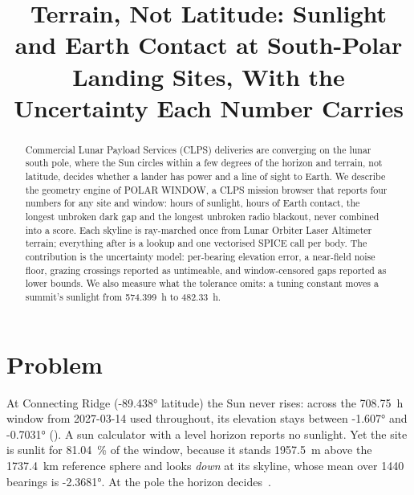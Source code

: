 \documentclass[conference]{IEEEtran}
\begin{document}
\title{Terrain, Not Latitude: Sunlight and Earth Contact at South-Polar Landing
Sites, With the Uncertainty Each Number Carries}

\author{
}

\maketitle

\begin{abstract}
Commercial Lunar Payload Services (CLPS) deliveries are converging on the lunar
south pole, where the Sun circles within a few degrees of the horizon and
terrain, not latitude, decides whether a lander has power and a line of sight to
Earth. We describe the geometry engine of POLAR WINDOW, a CLPS mission browser
that reports four numbers for any site and window: hours of sunlight, hours of
Earth contact, the longest unbroken dark gap and the longest unbroken radio
blackout, never combined into a score. Each skyline is ray-marched once from
Lunar Orbiter Laser Altimeter terrain; everything after is a lookup and one
vectorised SPICE call per body. The contribution is the uncertainty model:
per-bearing elevation error, a near-field noise floor, grazing crossings reported
as untimeable, and window-censored gaps reported as lower bounds. We also measure
what the tolerance omits: a tuning constant moves a summit's sunlight from
\qty{574.399}{\hour} to \qty{482.33}{\hour}.
\end{abstract}

\section{Problem}

At Connecting Ridge (\ang{-89.438} latitude) the Sun never rises: across the
\qty{708.75}{\hour} window from 2027-03-14 used throughout, its elevation stays
between \ang{-1.607} and \ang{-0.7031} (). A sun calculator
with a level horizon reports no sunlight. Yet the site is sunlit for
\qty{81.04}{\percent} of the window, because it stands \qty{1957.5}{\metre} above
the \qty{1737.4}{\kilo\metre} reference sphere and looks \emph{down} at its
skyline, whose mean over \num{1440} bearings is \ang{-2.3681}. At the pole the
horizon decides~\cite{mazarico2011illumination,bussey2010kaguya,speyerer2013persistently,glaser2014illumination}.
\end{document}
